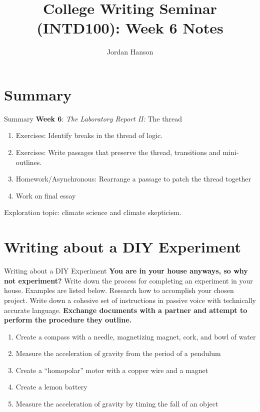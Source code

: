 \documentclass{beamer}
\title{College Writing Seminar (INTD100): Week 6 Notes}
\author{Jordan Hanson}
\institute{Whittier College Department of Physics and Astronomy}
\begin{document}
\maketitle

\section{Summary}

\begin{frame}{Summary}
\small
\textbf{Week 6}: \textit{The Laboratory Report II:} The thread
\begin{enumerate}
\item Exercises: Identify breaks in the thread of logic.
\item Exercises: Write passages that preserve the thread, transitions and mini-outlines.
\item Homework/Asynchronous: Rearrange a passage to patch the thread together
\item Work on final essay
\end{enumerate}
Exploration topic: climate science and climate skepticism.
\end{frame}

\section{Writing about a DIY Experiment}

\begin{frame}{Writing about a DIY Experiment}
\small
\textbf{\alert{You are in your house anyways, so why not experiment?}} Write down the process for completing an experiment in your house.  Examples are listed below.  Research how to accomplish your chosen project.  Write down a cohesive set of instructions in passive voice with technically accurate language.  \textbf{Exchange documents with a partner and attempt to perform the procedure they outline.}
\begin{enumerate}
\item Create a compass with a needle, magnetizing magnet, cork, and bowl of water
\item Measure the acceleration of gravity from the period of a pendulum
\item Create a ``homopolar'' motor with a copper wire and a magnet
\item Create a lemon battery
\item Measure the acceleration of gravity by timing the fall of an object
\end{enumerate}
\end{frame}
\end{document}
